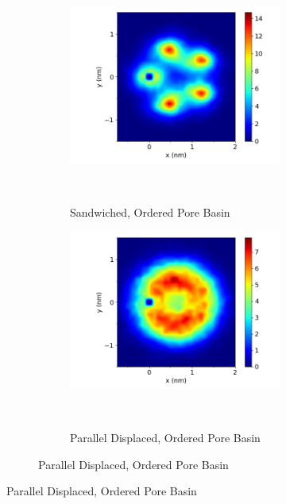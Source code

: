 \documentclass[journal=jpcbfk,manusciprt=article]{achemso}
\begin{document}
  \begin{figure}
  \begin{subfigure}{1\linewidth}
        \centering
        \begin{subfigure}{0.47\linewidth}
                \centering
                \includegraphics[width=\linewidth]{layered_xy_correlation.png}
                \caption{Sandwiched, Ordered Pore Basin}~\label{fig:sandwich_xy}
        \end{subfigure}%
        \begin{subfigure}{0.47\linewidth}
                \centering
                \includegraphics[width=\linewidth]{offset_xy_correlation.png}
                \caption{Parallel Displaced, Ordered Pore Basin}~\label{fig:offset_xy}

\end{subfigure}
\end{subfigure}
\end{figure}
\end{document}
